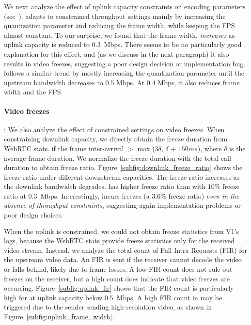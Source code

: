 We next analyze the effect of uplink capacity constraints on encoding
parameters
(see~).
\teams adapts to constrained throughput settings mainly by increasing the
quantization parameter and reducing the frame width, while keeping the FPS
almost constant. To our surprise, we found that the frame width, {\em
increases} as uplink capacity is reduced to 0.3~Mbps.
There seems to be no particularly good explanation for this effect, and (as we
discuss in the next paragraph) it also results in video freezes, suggesting a
poor design decision or implementation bug.  \meet follows a similar trend by
mostly increasing the quantization parameter until the upstream bandwidth
decreases to 0.5 Mbps. At 0.4 Mbps, it also reduces frame width and the FPS. 

\paragraph{Video freezes}: We also analyze the effect of constrained settings
on video freezes. When constraining downlink capacity, we directly obtain the freeze duration
from WebRTC stats.  if the frame
inter-arrival  $>$ max (3$\delta$, $\delta$ + $150 ms$), where $\delta$ is the
average frame duration. We normalize the freeze duration with the total call
duration to obtain freeze ratio.  Figure~\ref{subfig:downlink_freeze_ratio}
shows the freeze ratio under different downstream capacities. The freeze ratio
increases as the downlink bandwidth degrades. \meet has higher freeze ratio than \teamsbrowser with $10\%$ freeze ratio at 0.3~Mbps. Interestingly,
\teamsbrowser incurs freezes (a $3.6\%$ freeze ratio) {\em even in the absence
of throughput constraints}, suggesting again implementation problems or poor
design choices.

When the uplink is constrained, we could not obtain freeze statistics
from V1's logs, because the WebRTC stats provide freeze statistics only for
the received video stream.  Instead, we analyze the total count of Full Intra
Requests (FIR) for the upstream video data. An FIR is sent if the receiver
cannot decode the video or falls behind, likely due to frame losses.  A low
FIR count does not rule out freezes on the receiver, but a high count does
indicate that video freezes are occurring.  Figure~\ref{subfig:uplink_fir}
shows that the FIR count is particularly high for \teamsbrowser at uplink
capacity below 0.5~Mbps. A high FIR count in \teamsbrowser may be triggered
due to the sender sending high-resolution video, as shown in
Figure~\ref{subfig:uplink_frame_width}.


